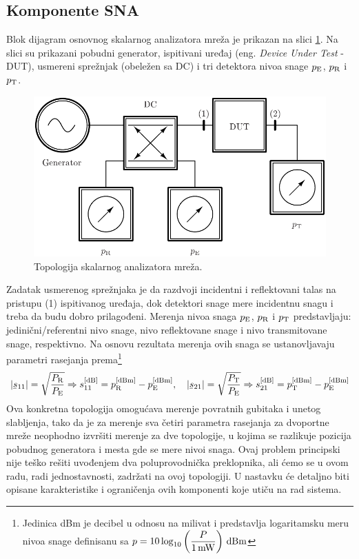 \documentclass[a4paper, 12pt, diplomski]{etf}
\renewcommand{\unit}[1]{\,{\rm #1}}   %
\newcommand{\faz}[1]{\underaccent{\bar}{#1}}
\begin{document}
\subsection{Komponente SNA}
Blok dijagram osnovnog skalarnog analizatora mreža je prikazan
na slici \ref{fig:sna_block}. Na slici su prikazani
pobudni generator, ispitivani uređaj 
(eng. \textit{Device Under Test} - DUT), 
usmereni sprežnjak (obeležen sa DC)
i tri detektora nivoa snage $p_{\rm E}$,
$p_{\rm R}$ i $p_{\rm T}$. 
%
\begin{figure}[b!]
    \centering
    \includegraphics{fig/sna_block_simple.pdf}
    \caption{Topologija skalarnog analizatora mreža.}
    \label{fig:sna_block}
\end{figure}
%
Zadatak 
usmerenog sprežnjaka je da razdvoji 
incidentni i reflektovani talas na 
pristupu (1) ispitivanog uređaja, dok 
detektori snage mere incidentnu snagu i
treba da budu dobro prilagođeni. Merenja 
nivoa
snaga $p_{\rm E}$, $p_{\rm R}$ i $p_{\rm T}$ predstavljaju:
 jedinični/referentni nivo snage, nivo
 reflektovane snage i nivo 
 transmitovane snage, respektivno. Na osnovu rezultata merenja ovih snaga se ustanovljavaju parametri rasejanja prema\footnote{
Jedinica dBm je decibel u odnosu na milivat i predstavlja
logaritamsku meru nivoa snage definisanu sa 
$p = 10 \log_{10} 
\left( \dfrac{P}{1\unit{mW}} \right) \unit{dBm}$
}
\begin{equation}
   |\faz s_{11}| = \sqrt{ \dfrac{P_{\rm R}}{P_{\rm E}} } \Rightarrow
    s_{11}^{[\rm dB]}
    = p_{\rm R}^{[\rm dBm]} - p_{\rm E}^{[\rm dBm]},
    \quad
    |\faz s_{21}| = \sqrt{ \dfrac{P_{\rm T}}{P_{\rm E}} } \Rightarrow
    s_{21}^{[\rm dB]}
    = p_{\rm T}^{[\rm dBm]} - p_{\rm E}^{[\rm dBm]}
    \label{eq:s11s212}
\end{equation}
%
Ova konkretna topologija omogućava merenje povratnih gubitaka i 
unetog slabljenja, tako da je za merenje sva četiri parametra
rasejanja za dvoportne mreže 
neophodno
izvršiti merenje za dve topologije, u kojima se 
razlikuje pozicija pobudnog generatora i mesta 
gde se mere nivoi snaga.
%
Ovaj problem principski nije teško rešiti uvođenjem dva
poluprovodnička preklopnika, ali ćemo se u ovom radu,
radi jednostavnosti, zadržati na 
ovoj topologiji.
U nastavku će detaljno biti opisane karakteristike i ograničenja
ovih komponenti koje utiču na rad sistema. 
\end{document}
